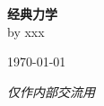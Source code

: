 \documentclass[11pt]{book}
\theoremstyle{definition}
\theoremstyle{plain}
\begin{document}
\begin{titlepage}
\setcounter{page}{-1}
\thispagestyle{empty}
	\begin{flushright}
	{\Huge\bfseries 经典力学}\\[\baselineskip]
	{by xxx}\par
	\today
	\end{flushright}
	\vfill
	{\Large\itshape 仅作内部交流用}
\end{titlepage}
\clearpage
\thispagestyle{empty}

\frontmatter
\tableofcontents
\mainmatter
	
	
\backmatter
\printindex
\end{document}

